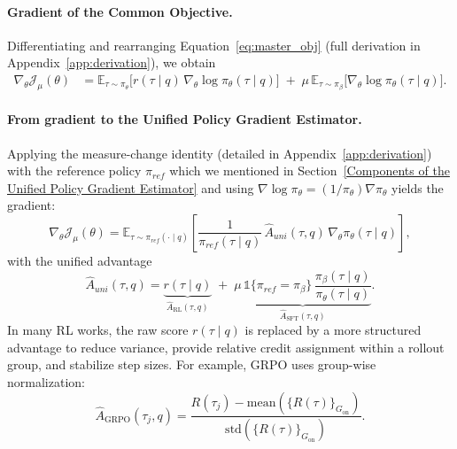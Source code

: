 \documentclass{article} %
\newcommand{\0}{\mathbb{0}}
\newcommand{\1}{\mathbb{1}}
\newcommand{\E}{\mathbb{E}}
\begin{document}
\paragraph{Gradient of the Common Objective.}
Differentiating and rearranging Equation~\ref{eq:master_obj} (full derivation in Appendix~\ref{app:derivation}), we obtain
\begin{equation}
\label{eq:master_grad_pi_measure}
\begin{aligned}
\nabla_\theta \mathcal{J}_{\mu}(\theta)
&= \E_{\tau\sim \pi_\theta}\!\Big[r(\tau\mid q)\,\nabla_\theta \log \pi_\theta(\tau\mid q)\Big]
\;+\; \mu\,\E_{\tau\sim \pi_\beta}\!\big[\nabla_\theta \log \pi_\theta(\tau\mid q)\big].
\end{aligned}
\end{equation}

\paragraph{From gradient to the Unified Policy Gradient Estimator.}
Applying the measure-change identity (detailed in Appendix~\ref{app:derivation}) with the reference policy $\pi_{ref}$ which we mentioned in Section~\ref{Components of the Unified Policy Gradient Estimator} and using $\nabla \log \pi_\theta=(1/\pi_\theta)\nabla \pi_\theta$ yields the gradient:
\begin{equation}
\label{eq:upge_form}
\nabla_\theta \mathcal{J}_{\mu}(\theta)
=
\E_{\tau\sim \pi_{ref}(\cdot\mid q)}
\!\left[
\frac{1}{\pi_{ref}(\tau\mid q)}\,
\widehat{A}_{uni}(\tau,q)\,
\nabla_\theta \pi_\theta(\tau\mid q)
\right],
\end{equation}
 with the unified advantage
\begin{equation}
\label{eq:A_uni}
\widehat{A}_{uni}(\tau,q)
=
\underbrace{r(\tau\mid q)}_{\widehat{A}_{\mathrm{RL}}(\tau,q)}
\;+\;
\underbrace{\mu\,\mathbb{1}\{\pi_{ref}=\pi_\beta\}\,\frac{\pi_\beta(\tau\mid q)}{\pi_\theta(\tau\mid q)}}_{\widehat{A}_{\mathrm{SFT}}(\tau,q)}.
\end{equation}
In many RL works, the raw score $r(\tau\mid q)$ is replaced by a more structured advantage to reduce variance, provide relative credit assignment within a rollout group, and stabilize step sizes. For example, GRPO uses group-wise normalization:
\begin{equation}
\widehat{A}_{\mathrm{GRPO}}(\tau_j,q) = \frac{R(\tau_j)-\mathrm{mean}(\{R(\tau)\}_{G_{\mathrm{on}}})}{\mathrm{std}(\{R(\tau)\}_{G_{\mathrm{on}}})}.
\end{equation}
\end{document}
